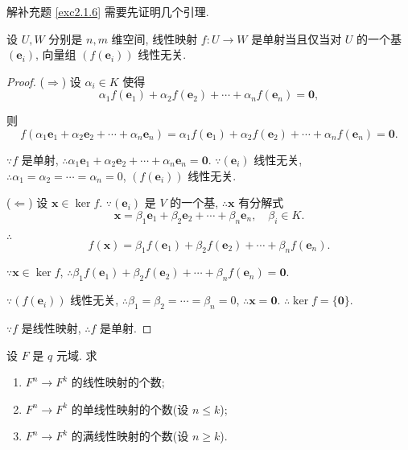 \documentclass[color=black,device=normal,lang=cn,mode=geye]{elegantnote}
\begin{document}
解补充题 \ref{exc2.1.6} 需要先证明几个引理.
\begin{lemma}\label{l6.1}
    设 $U,W$ 分别是 $n,m$ 维空间, 线性映射 $f:U\to W$ 是单射当且仅当对 $U$ 的一个基 $(\boldsymbol{e}_i)$, 向量组 $(f(\boldsymbol{e}_i))$ 线性无关.
\end{lemma}
\begin{proof}
    ($\Rightarrow$) 设 $\alpha_i\in K$ 使得
    \[\alpha_1f(\boldsymbol{e}_1)+\alpha_2f(\boldsymbol{e}_2)+\cdots+\alpha_nf(\boldsymbol{e}_n)=\boldsymbol{0},\]

    则
    \[f(\alpha_1\boldsymbol{e}_1+\alpha_2\boldsymbol{e}_2+\cdots+\alpha_n\boldsymbol{e}_n)=\alpha_1f(\boldsymbol{e}_1)+\alpha_2f(\boldsymbol{e}_2)+\cdots+\alpha_nf(\boldsymbol{e}_n)=\boldsymbol{0}.\]
    
    $\because f$ 是单射, $\therefore\alpha_1\boldsymbol{e}_1+\alpha_2\boldsymbol{e}_2+\cdots+\alpha_n\boldsymbol{e}_n=\boldsymbol{0}$. $\because(\boldsymbol{e}_i)$ 线性无关, $\therefore\alpha_1=\alpha_2=\cdots=\alpha_n=0$, $(f(\boldsymbol{e}_i))$ 线性无关.

    ($\Leftarrow$) 设 $\boldsymbol{x}\in\ker f$. $\because(\boldsymbol{e}_i)$ 是 $V$ 的一个基, $\therefore\boldsymbol{x}$ 有分解式
    \[\boldsymbol{x}=\beta_1\boldsymbol{e}_1+\beta_2\boldsymbol{e}_2+\cdots+\beta_n\boldsymbol{e}_n,\quad\beta_i\in K.\]

    $\therefore$
    \[f(\boldsymbol{x})=\beta_1f(\boldsymbol{e}_1)+\beta_2f(\boldsymbol{e}_2)+\cdots+\beta_nf(\boldsymbol{e}_n).\]

    $\because\boldsymbol{x}\in\ker f$, $\therefore\beta_1f(\boldsymbol{e}_1)+\beta_2f(\boldsymbol{e}_2)+\cdots+\beta_nf(\boldsymbol{e}_n)=\boldsymbol{0}$.
    
    $\because(f(\boldsymbol{e}_i))$ 线性无关, $\therefore\beta_1=\beta_2=\cdots=\beta_n=0$, $\therefore\boldsymbol{x}=\boldsymbol{0}$. $\therefore\ker f=\{\boldsymbol{0}\}$.

    $\because f$ 是线性映射, $\therefore f$ 是单射.
\end{proof}
\begin{exercisec}[2.1.6]\label{exc2.1.6}
    设 $F$ 是 $q$ 元域. 求
    \begin{enumerate}
        \def\labelenumi{(\arabic{enumi})}
        \item $F^n\to F^k$ 的线性映射的个数;
        \item $F^n\to F^k$ 的单线性映射的个数(设 $n\leq k$);
        \item $F^n\to F^k$ 的满线性映射的个数(设 $n\geq k$).
    \end{enumerate}
\end{exercisec}
\end{document}
